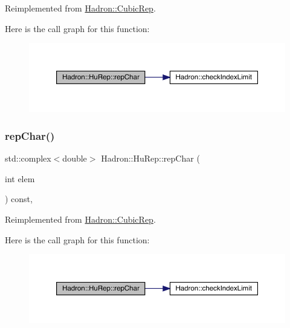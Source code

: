Reimplemented from \mbox{\hyperlink{structHadron_1_1CubicRep_af45227106e8e715e84b0af69cd3b36f8}{Hadron\+::\+Cubic\+Rep}}.

Here is the call graph for this function\+:
\nopagebreak
\begin{figure}[H]
\begin{center}
\leavevmode
\includegraphics[width=350pt]{d9/dd4/structHadron_1_1HuRep_a764617bf3dabef7cd69ffa034e550fff_cgraph}
\end{center}
\end{figure}
\mbox{\label{structHadron_1_1HuRep_a764617bf3dabef7cd69ffa034e550fff}} 
\subsubsection{\texorpdfstring{repChar()}{repChar()}\hspace{0.1cm}{\footnotesize\ttfamily [3/3]}}
{\footnotesize\ttfamily std\+::complex$<$double$>$ Hadron\+::\+Hu\+Rep\+::rep\+Char (\begin{DoxyParamCaption}\item[{int}]{elem }\end{DoxyParamCaption}) const\hspace{0.3cm}{\ttfamily [inline]}, {\ttfamily [virtual]}}



Reimplemented from \mbox{\hyperlink{structHadron_1_1CubicRep_af45227106e8e715e84b0af69cd3b36f8}{Hadron\+::\+Cubic\+Rep}}.

Here is the call graph for this function\+:
\nopagebreak
\begin{figure}[H]
\begin{center}
\leavevmode
\includegraphics[width=350pt]{d9/dd4/structHadron_1_1HuRep_a764617bf3dabef7cd69ffa034e550fff_cgraph}
\end{center}
\end{figure}
\mbox{\label{structHadron_1_1HuRep_a744a3604c724067d8912075d0d8acf59}} 
